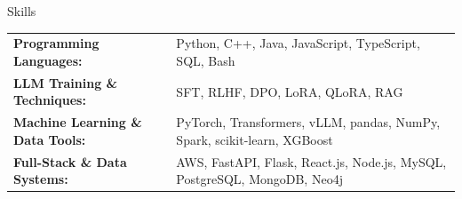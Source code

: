 \documentclass[hidelinks]{resume} %
\newcommand{\zcnote}[1]{{\bfseries \color{blue} #1}}
\begin{document}
\vspace{-5pt}
\begin{rSection}{S\MakeLowercase{kills}}


\begin{tabular}{@{}ll@{}}
\textbf{Programming Languages:} 
& Python, C\!+\!+, Java, JavaScript, TypeScript, SQL, Bash \\

\textbf{LLM Training \& Techniques:}
& SFT, RLHF, DPO, LoRA, QLoRA, RAG \\

\textbf{Machine Learning \& Data Tools:} 
& PyTorch, Transformers, vLLM, pandas, NumPy, Spark, scikit-learn, XGBoost \\

\textbf{Full-Stack \& Data Systems:} 
& AWS, FastAPI, Flask, React.js, Node.js, MySQL, PostgreSQL, MongoDB, Neo4j
\end{tabular}

% 
\end{rSection}

\end{document}
